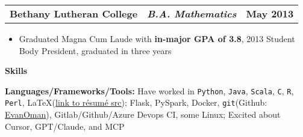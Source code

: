 \documentclass[letterpaper,10pt]{article}
\newcommand{\myitem}{\item[$\triangleright$]}
\newcommand{\resHeading}[1]{{
		\begin{tcolorbox}[size=title, sharp corners, colback=mygrey, colframe=mygrey]
			\centering\textbf{\large #1}
		\end{tcolorbox}
	}}
\newcommand{\threeColSubHeading}[3]{
		\begin{tabularx}{\textwidth}{XcX}
				\textbf{#1} & \textit{\textbf{#2}}  & \hfill\textbf{#3}
		\end{tabularx}
	}
\begin{document}
		\threeColSubHeading{Bethany Lutheran College}{B.A. Mathematics}{May 2013}
			\begin{itemize}
				\myitem Graduated Magna Cum Laude with \textbf{in-major GPA of 3.8}, 2013 Student Body President, graduated in three years
			\end{itemize}
	\resHeading{Skills}
		\textbf{Languages/Frameworks/Tools:}
		Have worked in \verb!Python!, \verb!Java!, \verb!Scala!, \verb!C!, \verb!R!, \verb!Perl!, \LaTeX (\underline{\href{https://github.com/EvanOman/Resume}{link to r\'esum\'e src}}); Flask, PySpark, Docker, \verb!git!(Github: \underline{\href{https://www.github.com/EvanOman}{EvanOman}}), Gitlab/Github/Azure Devops CI, some Linux; Excited about Cursor, GPT/Claude, and MCP

\end{document}
